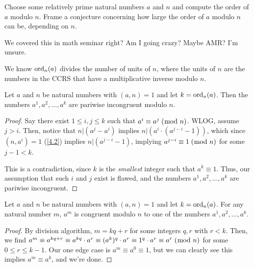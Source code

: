 \documentclass[../main.tex]{subfiles}
\begin{document}
\begin{ques} \label{4.7}
  Choose some relatively prime natural numbers $a$ and $n$ and compute the order of $a$ modulo $n$. Frame a conjecture concerning how large the order of $a$ modulo $n$ can be, depending on $n$.
\end{ques}

We covered this in math seminar right? Am I going crazy? Maybe AMR? I'm unsure.

We know $\operatorname{ord}_n (a)$ divides the number of units of $n$, where the units of $n$ are the numbers in the CCRS that have a multiplicative inverse modulo $n$.



\begin{thm} \label{4.8}
  Let $a$ and $n$ be natural numbers with $(a, n) = 1$ and let $k = \operatorname{ord}_n (a)$. Then the numbers $a^1, a^2, \ldots, a^k$ are pariwise incongruent modulo $n$.
\end{thm}

\begin{proof}
  Say there exist $1 \leq i, j \leq k$ such that $a^i \equiv a^j \; (\bmod \; n)$. WLOG, assume $j > i$. Then, notice that $n | (a^j - a^i)$ implies $n | (a^i \cdot (a^{j-i} - 1))$, which since $(n, a^i) = 1$ (\ref{4.2}) implies $n | (a^{j-i} - 1)$, implying $a^{j-i} \equiv 1 \; (\bmod \; n)$ for some $j-1 < k$.

  This is a contradiction, since $k$ is the \emph{smallest} integer such that $a^k \equiv 1$. Thus, our assumption that such $i$ and $j$ exist is flawed, and the numbers $a^1, a^2, \ldots, a^k$ are pariwise incongruent.
\end{proof}



\begin{thm} \label{4.9}
  Let $a$ and $n$ be natural numbers with $(a, n) = 1$ and let $k = \operatorname{ord}_n (a)$. For any natural number $m$, $a^m$ is congruent modulo $n$ to one of the numbers $a^1, a^2, \ldots, a^k$.
\end{thm}

\begin{proof}
  By division algorithm, $m = kq + r$ for some integers $q, r$ with $r < k$. Then, we find $a^m \equiv a^{kq + r} \equiv a^{kq} \cdot a^r \equiv (a^k)^q \cdot a^r \equiv 1^q \cdot a^r \equiv a^r \; (\bmod \; n)$ for some $0 \leq r \leq k-1$. Our one edge case is $a^m \equiv a^0 \equiv 1$, but we can clearly see this implies $a^m \equiv a^k$, and we're done.
\end{proof}
\end{document}
